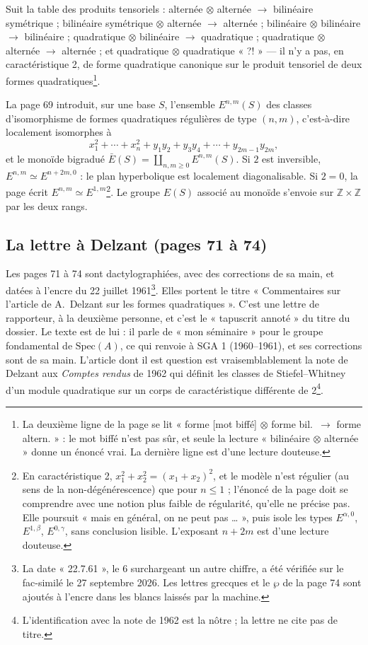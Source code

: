 \documentclass[11pt,a4paper]{article}
\begin{document}
Suit la table des produits tensoriels : alternée $\otimes$ alternée $\to$
bilinéaire symétrique ; bilinéaire symétrique $\otimes$ alternée $\to$ alternée ;
bilinéaire $\otimes$ bilinéaire $\to$ bilinéaire ; quadratique $\otimes$ bilinéaire
$\to$ quadratique ; quadratique $\otimes$ alternée $\to$ alternée ; et quadratique
$\otimes$ quadratique « ?! » — il n'y a pas, en caractéristique 2, de forme
quadratique canonique sur le produit tensoriel de deux formes
quadratiques\footnote{La deuxième ligne de la page se lit « forme [mot biffé]
$\otimes$ forme bil.\ $\to$ forme altern. » : le mot biffé n'est pas sûr, et seule
la lecture « bilinéaire $\otimes$ alternée » donne un énoncé vrai. La dernière
ligne est d'une lecture douteuse.}.

La page 69 introduit, sur une base $S$, l'ensemble $E^{n,m}(S)$ des classes
d'isomorphisme de formes quadratiques régulières de type $(n,m)$, c'est-à-dire
localement isomorphes à
\[
x_1^2 + \cdots + x_n^2 + y_1 y_2 + y_3 y_4 + \cdots + y_{2m-1} y_{2m},
\]
et le monoïde bigradué $\bar E(S) = \coprod_{n,m \geq 0} E^{n,m}(S)$. Si $2$ est
inversible, $E^{n,m} \simeq E^{n+2m,0}$ : le plan hyperbolique est localement
diagonalisable. Si $2 = 0$, la page écrit $E^{n,m} \simeq E^{1,m}$\footnote{En
caractéristique 2, $x_1^2 + x_2^2 = (x_1 + x_2)^2$, et le modèle n'est régulier
(au sens de la non-dégénérescence) que pour $n \leq 1$ ; l'énoncé de la page doit
se comprendre avec une notion plus faible de régularité, qu'elle ne précise pas.
Elle poursuit « mais en général, on ne peut pas … », puis isole les types
$E^{\alpha,0}$, $E^{1,\beta}$, $E^{0,\gamma}$, sans conclusion lisible. L'exposant
$n + 2m$ est d'une lecture douteuse.}. Le groupe $E(S)$ associé au
monoïde s'envoie sur $\mathbb{Z} \times \mathbb{Z}$ par les deux rangs.

\subsection*{La lettre à Delzant (pages 71 à 74)}

Les pages 71 à 74 sont dactylographiées, avec des corrections de sa main, et
datées à l'encre du 22 juillet 1961\footnote{La date « 22.7.61 », le 6 surchargeant
un autre chiffre, a été vérifiée sur le fac-similé le 27 septembre 2026. Les
lettres grecques et le $\wp$ de la page 74 sont ajoutés à l'encre dans les blancs
laissés par la machine.}. Elles portent le titre « Commentaires sur l'article
de A.~Delzant sur les formes quadratiques ». C'est une lettre de rapporteur, à
la deuxième personne, et c'est le « tapuscrit annoté » du titre du dossier. Le
texte est de lui : il parle de « mon séminaire » pour le groupe fondamental de
$\mathrm{Spec}(A)$, ce qui renvoie à SGA 1 (1960--1961), et ses corrections sont
de sa main. L'article dont il est question est vraisemblablement la note de
Delzant aux \emph{Comptes rendus} de 1962 qui définit les classes de
Stiefel--Whitney d'un module quadratique sur un corps de caractéristique
différente de 2\footnote{L'identification avec la note de 1962 est la nôtre ; la
lettre ne cite pas de titre.}.
\end{document}
